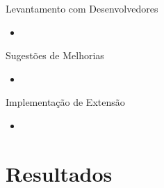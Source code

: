 \documentclass[t,14pt,mathserif]{beamer}
\begin{document}
\begin{frame}{Levantamento com Desenvolvedores}

    \begin{itemize}
        \item
    \end{itemize}

\end{frame}

\begin{frame}{Sugestões de Melhorias}

    \begin{itemize}
        \item
    \end{itemize}

\end{frame}

\begin{frame}{Implementação de Extensão}

    \begin{itemize}
        \item
    \end{itemize}

\end{frame}

\section{Resultados}
\end{document}
